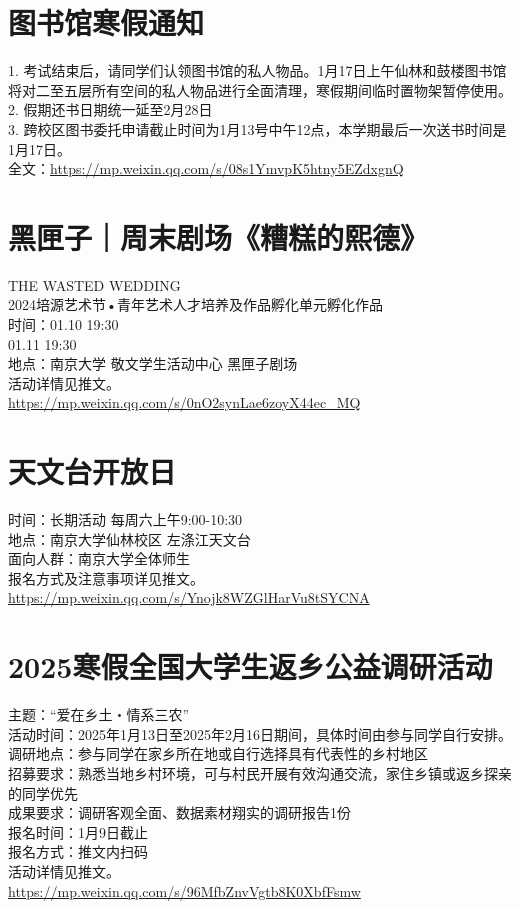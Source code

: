 \documentclass[letterpaper, 12pt]{article}
\begin{document}
\begin{multicols}{2}
\section{图书馆寒假通知}
1. 考试结束后，请同学们认领图书馆的私人物品。1月17日上午仙林和鼓楼图书馆将对二至五层所有空间的私人物品进行全面清理，寒假期间临时置物架暂停使用。\\
2. 假期还书日期统一延至2月28日\\
3. 跨校区图书委托申请截止时间为1月13号中午12点，本学期最后一次送书时间是1月17日。\\
全文：\url{https://mp.weixin.qq.com/s/08s1YmvpK5htny5EZdxgnQ}

\section{黑匣子｜周末剧场《糟糕的熙德》}
THE WASTED WEDDING\\
2024培源艺术节•青年艺术人才培养及作品孵化单元孵化作品\\
时间：01.10 19:30\\
01.11 19:30\\
地点：南京大学 敬文学生活动中心 黑匣子剧场\\
活动详情见推文。\\
\url{https://mp.weixin.qq.com/s/0nO2synLae6zoyX44ec_MQ}

\section{天文台开放日}
时间：长期活动 每周六上午9:00-10:30\\
地点：南京大学仙林校区 左涤江天文台\\
面向人群：南京大学全体师生\\
报名方式及注意事项详见推文。\\
\url{https://mp.weixin.qq.com/s/Ynojk8WZGlHarVu8tSYCNA}

\section{2025寒假全国大学生返乡公益调研活动}
主题：“爱在乡土・情系三农”\\
活动时间：2025年1月13日至2025年2月16日期间，具体时间由参与同学自行安排。\\
调研地点：参与同学在家乡所在地或自行选择具有代表性的乡村地区\\
招募要求：熟悉当地乡村环境，可与村民开展有效沟通交流，家住乡镇或返乡探亲的同学优先\\
成果要求：调研客观全面、数据素材翔实的调研报告1份\\
报名时间：1月9日截止\\
报名方式：推文内扫码\\
活动详情见推文。\\
\url{https://mp.weixin.qq.com/s/96MfbZnvVgtb8K0XbfFsmw}

\end{multicols}
\end{document}
